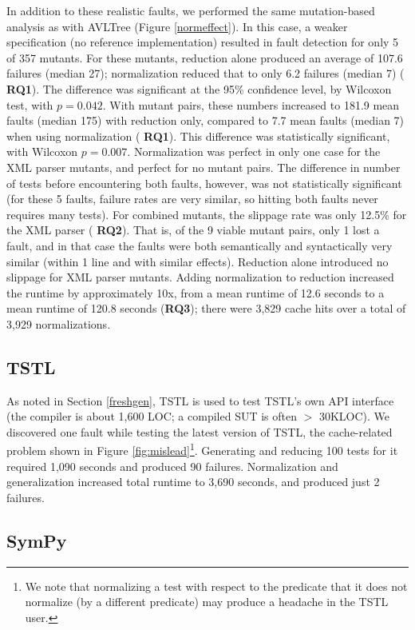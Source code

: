 In addition to these realistic faults, we performed the same
mutation-based analysis as with AVLTree (Figure \ref{normeffect}). In
this case, a weaker specification (no reference implementation)
resulted in fault detection for only 5 of 357 mutants.  For these
mutants, reduction alone produced an average of 107.6 failures (median
27); normalization reduced that to only 6.2 failures (median 7) ({\bf
  RQ1}).  The difference was significant at the 95\% confidence level,
by Wilcoxon test, with $p=0.042$.  With mutant pairs, these numbers
increased to 181.9 mean faults (median 175) with reduction only,
compared to 7.7 mean faults (median 7) when using normalization ({\bf
  RQ1}).  This difference was statistically significant, with Wilcoxon
$p=0.007$.  Normalization was perfect in only one case for
the XML parser mutants, and perfect for no mutant pairs.  The
difference in number of tests before encountering both faults,
however, was not statistically significant (for these 5 faults,
failure rates are very similar, so hitting both faults never requires
many tests).  For combined
mutants, the slippage rate was only 12.5\% for the XML parser ({\bf
  RQ2}).  That is, of the 9 viable mutant pairs, only 1 lost a fault,
and in that case the faults were both semantically and syntactically
very similar (within 1 line and with similar effects).  Reduction alone introduced no slippage for XML parser
mutants.  Adding normalization to reduction increased the runtime by
approximately 10x, from a mean runtime of 12.6 seconds to a mean
runtime of 120.8 seconds ({\bf RQ3}); there were 3,829 cache hits over
a total of 3,929 normalizations.

\subsection{TSTL}

As noted in Section \ref{freshgen}, TSTL is used to test TSTL's own
API interface (the compiler is about 1,600 LOC; a compiled SUT is
often $>$ 30KLOC).  We discovered one fault while testing
the latest version of TSTL, the cache-related problem shown in Figure
\ref{fig:mislead}\footnote{We note that normalizing a test with
  respect to the predicate that it does not normalize (by a different
  predicate) may produce a headache in the TSTL user.}.
Generating and reducing 100 tests for it required 1,090 seconds
and produced 90 failures.  Normalization and generalization
increased total runtime to 3,690 seconds, and produced just 2
failures.

\subsection{SymPy}

